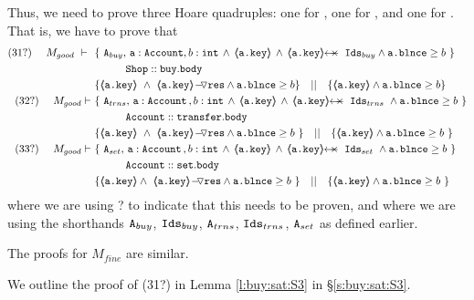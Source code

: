 \begin{proofO}
\normalsize
Thus, we need to prove  three Hoare quadruples: one for , one for  , and one for  .  That is, we have to prove that
 \small
\begin{align*}
\text{(31?)}  \ \ \ \ M_{good}\ \vdash  \  \ 
		&	\{  \ \Alocals, \, \prg{a}:\prg{Account}, b:\prg{int} \, \wedge\, {\inside{\prg{a.key}}} \, \wedge \, \protectedFrom {\prg{a.key}} {\Ids} \wedge \prg{a.\balance}\geq b \  \} \\
		& \SPT \prg{Shop}::\prg{buy}.\prg{body}\ \\  
		& \{ {\inside{\prg{a.key}}}\ \wedge\ {\PushASLong {\prg{res}} {\inside{\prg{a.key}}}}  \wedge \prg{a.\balance}\geq b \} \ \ \  || \ \ \ 
		   \{ {\inside{\prg{a.key}}}  \wedge \prg{a.\balance}\geq b \}
\\
\text{(32?)}  \ \ \ \ M_{good} \vdash \ 
		&	\{  \ \Alocalstr, \, \prg{a}:\prg{Account}\, , b:\prg{int} \, \wedge\,  {\inside{\prg{a.key}}} \, \wedge \, \protectedFrom {\prg{a.key}} {\Idstr}  \ \wedge \prg{a.\balance}\geq b \  \} \\
		& \SPT \prg{Account}::\prg{transfer}.\prg{body}\ \\  
		& \{ {\inside{\prg{a.key}}}\ \wedge\ {\PushASLong {\prg{res}} {\inside{\prg{a.key}}} } \wedge \prg{a.\balance}\geq b \  \} \ \ \  || \ \ \ 
		   \{ {\inside{\prg{a.key}}} \wedge \prg{a.\balance}\geq b \  \}
\\
\text{(33?)}  \ \ \ \ M_{good} \vdash \ 
		&	\{  \ \Alocalsset, \, \prg{a}:\prg{Account}\, , b:\prg{int} \, \wedge\,  {\inside{\prg{a.key}}} \, \wedge \, \protectedFrom {\prg{a.key}} {\Idsset}  \ \wedge \prg{a.\balance}\geq b \  \} \\
		& \SPT \prg{Account}::\prg{set}.\prg{body}\ \\  
 		& \{ {\inside{\prg{a.key}}}  \wedge\ {\PushASLong {\prg{res}} {\inside{\prg{a.key}}}}   \wedge \prg{a.\balance}\geq b \  \}\ \ \  || \ \ \ 
		   \{ {\inside{\prg{a.key}}} \wedge \prg{a.\balance}\geq b \  \} 
\end{align*}
\normalsize
where we are using ? to indicate that this needs to be proven, and 
where we are using the shorthands $\mbox{\normalfont{\texttt{A}}}_{buy}$,   $\mbox{\normalfont{\texttt{Ids}}}_{buy}$, $\mbox{\normalfont{\texttt{A}}}_{trns}$, $\mbox{\normalfont{\texttt{Ids}}}_{trns}$, $\mbox{\normalfont{\texttt{A}}}_{set}$ as defined earlier.

 \end{proofO}
 
The proofs for $M_{fine}$ are similar.

%
 We outline the proof of (31?) in Lemma \ref{l:buy:sat:S3}  in \S \ref{s:buy:sat:S3}.

